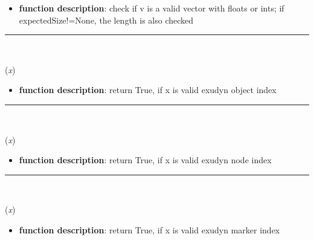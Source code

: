 \begin{itemize}[leftmargin=1.4cm]
\begin{itemize}[leftmargin=0.7cm]
\item[--]
{\bf function description}: check if v is a valid vector with floats or ints; if expectedSize!=None, the length is also checked
\vspace{12pt}\end{itemize}
%
\noindent\rule{8cm}{0.75pt}\vspace{1pt} \\ 
\begin{flushleft}
\label{sec:advancedUtilities:IsValidObjectIndex}
({\it x})
\end{flushleft}
\setlength{\itemindent}{0.7cm}
\begin{itemize}[leftmargin=0.7cm]
\item[--]
{\bf function description}: return True, if x is valid exudyn object index
\vspace{12pt}\end{itemize}
%
\noindent\rule{8cm}{0.75pt}\vspace{1pt} \\ 
\begin{flushleft}
\label{sec:advancedUtilities:IsValidNodeIndex}
({\it x})
\end{flushleft}
\setlength{\itemindent}{0.7cm}
\begin{itemize}[leftmargin=0.7cm]
\item[--]
{\bf function description}: return True, if x is valid exudyn node index
\vspace{12pt}\end{itemize}
%
\noindent\rule{8cm}{0.75pt}\vspace{1pt} \\ 
\begin{flushleft}
\label{sec:advancedUtilities:IsValidMarkerIndex}
({\it x})
\end{flushleft}
\setlength{\itemindent}{0.7cm}
\begin{itemize}[leftmargin=0.7cm]
\item[--]
{\bf function description}: return True, if x is valid exudyn marker index
\vspace{12pt}\end{itemize}

\end{itemize}
